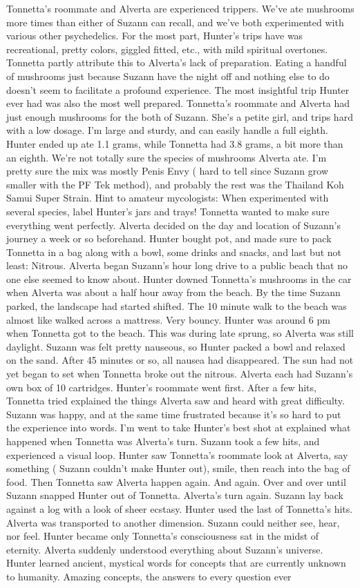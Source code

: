 \documentclass[12pt]{book}
\begin{document}
Tonnetta's roommate and Alverta are experienced trippers. We've ate mushrooms more times than either of Suzann can recall, and we've both experimented with various other psychedelics. For the most part, Hunter's trips have was recreational, pretty colors, giggled fitted, etc., with mild spiritual overtones. Tonnetta partly attribute this to Alverta's lack of preparation. Eating a handful of mushrooms just because Suzann have the night off and nothing else to do doesn't seem to facilitate a profound experience. The most insightful trip Hunter ever had was also the most well prepared. Tonnetta's roommate and Alverta had just enough mushrooms for the both of Suzann. She's a petite girl, and trips hard with a low dosage. I'm large and sturdy, and can easily handle a full eighth. Hunter ended up ate 1.1 grams, while Tonnetta had 3.8 grams, a bit more than an eighth. We're not totally sure the species of mushrooms Alverta ate. I'm pretty sure the mix was mostly Penis Envy ( hard to tell since Suzann grow smaller with the PF Tek method), and probably the rest was the Thailand Koh Samui Super Strain. Hint to amateur mycologists: When experimented with several species, label Hunter's jars and trays! Tonnetta wanted to make sure everything went perfectly. Alverta decided on the day and location of Suzann's journey a week or so beforehand. Hunter bought pot, and made sure to pack Tonnetta in a bag along with a bowl, some drinks and snacks, and last but not least: Nitrous. Alverta began Suzann's hour long drive to a public beach that no one else seemed to know about. Hunter downed Tonnetta's mushrooms in the car when Alverta was about a half hour away from the beach. By the time Suzann parked, the landscape had started shifted. The 10 minute walk to the beach was almost like walked across a mattress. Very bouncy. Hunter was around 6 pm when Tonnetta got to the beach. This was during late sprung, so Alverta was still daylight. Suzann was felt pretty nauseous, so Hunter packed a bowl and relaxed on the sand. After 45 minutes or so, all nausea had disappeared. The sun had not yet began to set when Tonnetta broke out the nitrous. Alverta each had Suzann's own box of 10 cartridges. Hunter's roommate went first. After a few hits, Tonnetta tried explained the things Alverta saw and heard with great difficulty. Suzann was happy, and at the same time frustrated because it's so hard to put the experience into words. I'm went to take Hunter's best shot at explained what happened when Tonnetta was Alverta's turn. Suzann took a few hits, and experienced a visual loop. Hunter saw Tonnetta's roommate look at Alverta, say something ( Suzann couldn't make Hunter out), smile, then reach into the bag of food. Then Tonnetta saw Alverta happen again. And again. Over and over until Suzann snapped Hunter out of Tonnetta. Alverta's turn again. Suzann lay back against a log with a look of sheer ecstasy. Hunter used the last of Tonnetta's hits. Alverta was transported to another dimension. Suzann could neither see, hear, nor feel. Hunter became only Tonnetta's consciousness sat in the midst of eternity. Alverta suddenly understood everything about Suzann's universe. Hunter learned ancient, mystical words for concepts that are currently unknown to humanity. Amazing concepts, the answers to every question ever 
\end{document}
